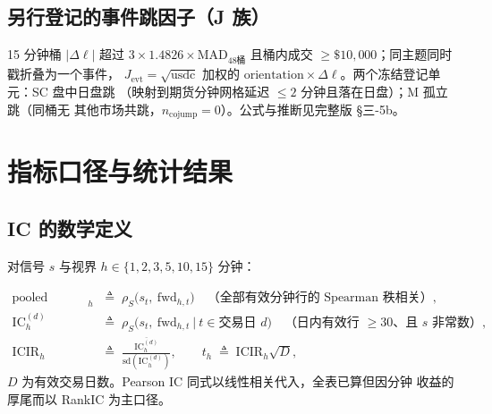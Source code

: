 \documentclass[11pt, a4paper]{ctexart}
\newcommand{\eqdef}{\;\triangleq\;}
\begin{document}
\subsection{另行登记的事件跳因子（J 族）}

15 分钟桶 $|\Delta\ell|$ 超过 $3\times1.4826\times\mathrm{MAD}_{48\text{桶}}$
且桶内成交 $\ge\$10{,}000$；同主题同时戳折叠为一个事件，
$J_{\mathrm{evt}}=\sqrt{\mathrm{usdc}}$ 加权的
$\mathrm{orientation}\times\Delta\ell$。两个冻结登记单元：SC 盘中日盘跳
（映射到期货分钟网格延迟 $\le2$ 分钟且落在日盘）；M 孤立跳（同桶无
其他市场共跳，$n_{\mathrm{cojump}}=0$）。公式与推断见完整版 §三-5b。

\section{指标口径与统计结果}\label{sec:stats}

\subsection{IC 的数学定义}

对信号 $s$ 与视界 $h\in\{1,2,3,5,10,15\}$ 分钟：

\begin{align}
\text{pooled RankIC}_h &\eqdef
  \rho_S\big(s_t,\ \mathrm{fwd}_{h,t}\big)
  \quad\text{（全部有效分钟行的 Spearman 秩相关）},\\
\mathrm{IC}^{(d)}_h &\eqdef
  \rho_S\big(s_t,\ \mathrm{fwd}_{h,t}\ \big|\ t\in \text{交易日 } d\big)
  \quad\text{（日内有效行 $\ge30$、且 $s$ 非常数）},\\
\mathrm{ICIR}_h &\eqdef
  \frac{\overline{\mathrm{IC}^{(d)}_h}}{\mathrm{sd}(\mathrm{IC}^{(d)}_h)},
  \qquad
  t_h \eqdef \mathrm{ICIR}_h\sqrt{D},
\end{align}
$D$ 为有效交易日数。Pearson IC 同式以线性相关代入，全表已算但因分钟
收益的厚尾而以 RankIC 为主口径。
\end{document}
